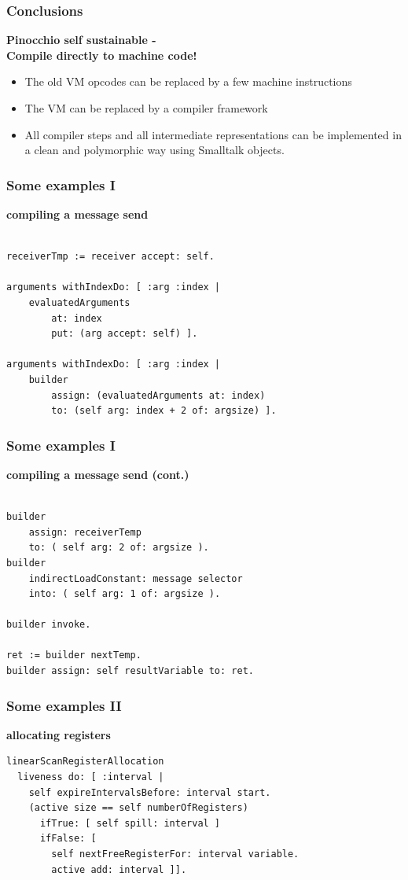 \documentclass{beamer}
\begin{document}
\begin{frame}[fragile]
    \frametitle{Conclusions}
    {\bf Pinocchio self sustainable - \\Compile directly to machine code!}
    \begin{itemize}
        \item The old VM opcodes can be replaced by a few machine instructions
        \item The VM can be replaced by a compiler framework
        \item All compiler steps and all intermediate representations can 
            be implemented in a clean and polymorphic way using Smalltalk objects.
    \end{itemize}
\end{frame}

\lstset{language=Smalltalk}

\begin{frame}[fragile]
    \frametitle{Some examples I}
    {\bf compiling a message send}
    \begin{lstlisting}

receiverTmp := receiver accept: self.
    
arguments withIndexDo: [ :arg :index |
    evaluatedArguments 
        at: index 
        put: (arg accept: self) ].
    
arguments withIndexDo: [ :arg :index |
    builder
        assign: (evaluatedArguments at: index)
        to: (self arg: index + 2 of: argsize) ].
    \end{lstlisting}
\end{frame}

\begin{frame}[fragile]
    \frametitle{Some examples I}
    {\bf compiling a message send (cont.)}
    \begin{lstlisting}
    
builder 
    assign: receiverTemp 
    to: ( self arg: 2 of: argsize ).
builder 
    indirectLoadConstant: message selector 
    into: ( self arg: 1 of: argsize ).
        
builder invoke.

ret := builder nextTemp.
builder assign: self resultVariable to: ret.

    \end{lstlisting}
\end{frame}

\begin{frame}[fragile]
    \frametitle{Some examples II}
    {\bf allocating registers}
    \begin{lstlisting}
linearScanRegisterAllocation
  liveness do: [ :interval |
    self expireIntervalsBefore: interval start.
    (active size == self numberOfRegisters)
      ifTrue: [ self spill: interval ]
      ifFalse: [ 
        self nextFreeRegisterFor: interval variable.  
        active add: interval ]].
    \end{lstlisting}
\end{frame}
\end{document}
